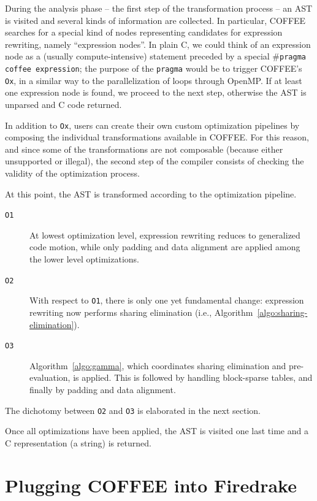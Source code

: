 During the analysis phase -- the first step of the transformation process -- an AST is visited and several kinds of information are collected. In particular, COFFEE searches for a special kind of nodes representing candidates for expression rewriting, namely ``expression nodes''. In plain C, we could think of an expression node as a (usually compute-intensive) statement preceded by a special \texttt{$\#$pragma coffee expression}; the purpose of the \texttt{pragma} would be to trigger COFFEE's \texttt{Ox}, in a similar way to the parallelization of loops through OpenMP. If at least one expression node is found, we proceed to the next step, otherwise the AST is unparsed and C code returned.

In addition to \texttt{Ox}, users can create their own custom optimization pipelines by composing the individual transformations available in COFFEE. For this reason, and since some of the transformations are not composable (because either unsupported or illegal), the second step of the compiler consists of checking the validity of the optimization process. 

At this point, the AST is transformed according to the optimization pipeline. 
\begin{description}
\item[\texttt{O1}] At lowest optimization level, expression rewriting reduces to generalized code motion, while only padding and data alignment are applied among the lower level optimizations.
\item[\texttt{O2}] With respect to \texttt{O1}, there is only one yet fundamental change: expression rewriting now performs sharing elimination (i.e., Algorithm~\ref{algo:sharing-elimination}).
\item[\texttt{O3}] Algorithm~\ref{algo:gamma}, which coordinates sharing elimination and pre-evaluation, is applied. This is followed by handling block-sparse tables, and finally by padding and data alignment. 
\end{description}
The dichotomy between \texttt{O2} and \texttt{O3} is elaborated in the next section.

Once all optimizations have been applied, the AST is visited one last time and a C representation (a string) is returned.

\section{Plugging COFFEE into Firedrake}
\label{sec:coffee-implementation}

